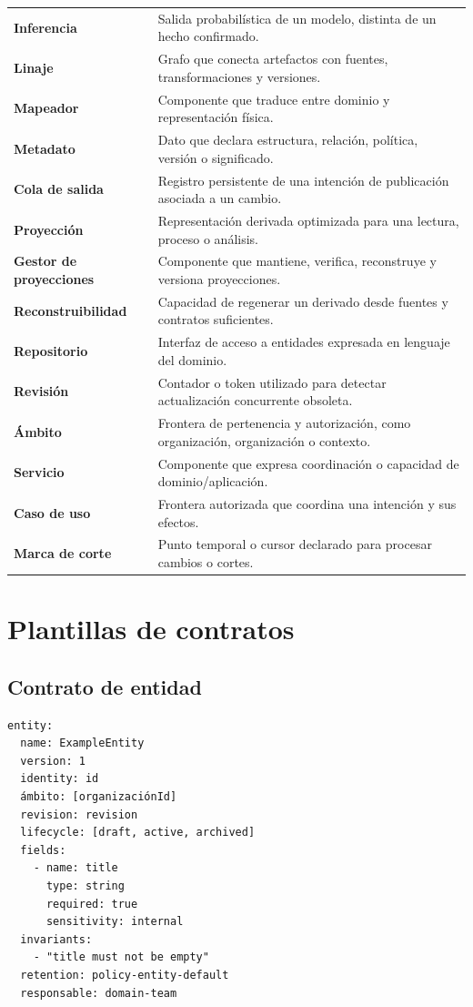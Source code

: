 \begin{longtable}{>{\bfseries}p{3.6cm}p{10.6cm}}
Inferencia & Salida probabilística de un modelo, distinta de un hecho confirmado.\\
Linaje & Grafo que conecta artefactos con fuentes, transformaciones y versiones.\\
Mapeador & Componente que traduce entre dominio y representación física.\\
Metadato & Dato que declara estructura, relación, política, versión o significado.\\
Cola de salida & Registro persistente de una intención de publicación asociada a un cambio.\\
Proyección & Representación derivada optimizada para una lectura, proceso o análisis.\\
Gestor de proyecciones & Componente que mantiene, verifica, reconstruye y versiona proyecciones.\\
Reconstruibilidad & Capacidad de regenerar un derivado desde fuentes y contratos suficientes.\\
Repositorio & Interfaz de acceso a entidades expresada en lenguaje del dominio.\\
Revisión & Contador o token utilizado para detectar actualización concurrente obsoleta.\\
Ámbito & Frontera de pertenencia y autorización, como organización, organización o contexto.\\
Servicio & Componente que expresa coordinación o capacidad de dominio/aplicación.\\
Caso de uso & Frontera autorizada que coordina una intención y sus efectos.\\
Marca de corte & Punto temporal o cursor declarado para procesar cambios o cortes.\\
\bottomrule
\end{longtable}

\chapter{Plantillas de contratos}
\begingroup
\small

\section{Contrato de entidad}

\begin{verbatim}
entity:
  name: ExampleEntity
  version: 1
  identity: id
  ámbito: [organizaciónId]
  revision: revision
  lifecycle: [draft, active, archived]
  fields:
    - name: title
      type: string
      required: true
      sensitivity: internal
  invariants:
    - "title must not be empty"
  retention: policy-entity-default
  responsable: domain-team
\end{verbatim}

